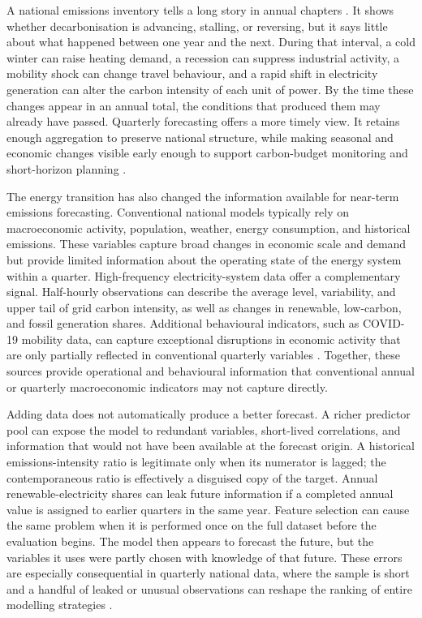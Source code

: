\documentclass[preprint,12pt]{elsarticle}
\begin{document}
A national emissions inventory tells a long story in annual chapters \citep{arasvan2022,yuan2024,an2024}. It shows whether decarbonisation is advancing, stalling, or reversing, but it says little about what happened between one year and the next. During that interval, a cold winter can raise heating demand, a recession can suppress industrial activity, a mobility shock can change travel behaviour, and a rapid shift in electricity generation can alter the carbon intensity of each unit of power. By the time these changes appear in an annual total, the conditions that produced them may already have passed. Quarterly forecasting offers a more timely view. It retains enough aggregation to preserve national structure, while making seasonal and economic changes visible early enough to support carbon-budget monitoring and short-horizon planning \citep{lamb2021,meinshausen2022,jin2024}.

The energy transition has also changed the information available for near-term emissions forecasting. Conventional national models typically rely on macroeconomic activity, population, weather, energy consumption, and historical emissions. These variables capture broad changes in economic scale and demand but provide limited information about the operating state of the energy system within a quarter. High-frequency electricity-system data offer a complementary signal. Half-hourly observations can describe the average level, variability, and upper tail of grid carbon intensity, as well as changes in renewable, low-carbon, and fossil generation shares. Additional behavioural indicators, such as COVID-19 mobility data, can capture exceptional disruptions in economic activity that are only partially reflected in conventional quarterly variables \citep{mafimisebi2026,sahinchen2023}. Together, these sources provide operational and behavioural information that conventional annual or quarterly macroeconomic indicators may not capture directly.

Adding data does not automatically produce a better forecast. A richer predictor pool can expose the model to redundant variables, short-lived correlations, and information that would not have been available at the forecast origin. A historical emissions-intensity ratio is legitimate only when its numerator is lagged; the contemporaneous ratio is effectively a disguised copy of the target. Annual renewable-electricity shares can leak future information if a completed annual value is assigned to earlier quarters in the same year. Feature selection can cause the same problem when it is performed once on the full dataset before the evaluation begins. The model then appears to forecast the future, but the variables it uses were partly chosen with knowledge of that future. These errors are especially consequential in quarterly national data, where the sample is short and a handful of leaked or unusual observations can reshape the ranking of entire modelling strategies \citep{cerqueira2020,hewamalage2023}.
\end{document}
